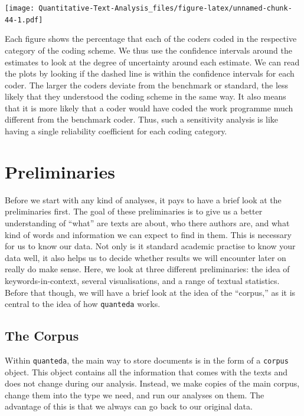 \documentclass[
]{book}
\begin{document}
\texttt{[image: Quantitative-Text-Analysis\_files/figure-latex/unnamed-chunk-44-1.pdf]}

Each figure shows the percentage that each of the coders coded in the respective category of the coding scheme. We thus use the confidence intervals around the estimates to look at the degree of uncertainty around each estimate. We can read the plots by looking if the dashed line is within the confidence intervals for each coder. The larger the coders deviate from the benchmark or standard, the less likely that they understood the coding scheme in the same way. It also means that it is more likely that a coder would have coded the work programme much different from the benchmark coder. Thus, such a sensitivity analysis is like having a single reliability coefficient for each coding category.

\hypertarget{preliminaries}{%
\chapter{Preliminaries}\label{preliminaries}}

Before we start with any kind of analyses, it pays to have a brief look at the preliminaries first. The goal of these preliminaries is to give us a better understanding of ``what'' are texts are about, who there authors are, and what kind of words and information we can expect to find in them. This is necessary for us to know our data. Not only is it standard academic practise to know your data well, it also helps us to decide whether results we will encounter later on really do make sense. Here, we look at three different preliminaries: the idea of keywords-in-context, several visualisations, and a range of textual statistics. Before that though, we will have a brief look at the idea of the ``corpus,'' as it is central to the idea of how \texttt{quanteda} works.

\hypertarget{the-corpus}{%
\section{The Corpus}\label{the-corpus}}

Within \texttt{quanteda}, the main way to store documents is in the form of a \texttt{corpus} object. This object contains all the information that comes with the texts and does not change during our analysis. Instead, we make copies of the main corpus, change them into the type we need, and run our analyses on them. The advantage of this is that we always can go back to our original data.
\end{document}
